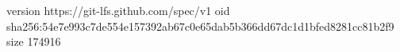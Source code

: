 version https://git-lfs.github.com/spec/v1
oid sha256:54e7e993c7de554e157392ab67c0e65dab5b366dd67dc1d1bfed8281cc81b2f9
size 174916
